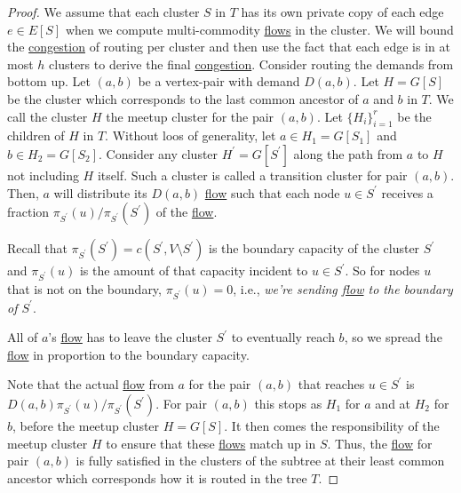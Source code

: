 \begin{proof}
	We assume that each cluster \(S\) in \(T\) has its own private copy of each edge \(e \in E[S]\) when we compute multi-commodity \hyperref[def:flow]{flows} in the cluster. We will bound the \hyperref[def:congestion]{congestion} of routing per cluster and then use the fact that each edge is in at most \(h\) clusters to derive the final \hyperref[def:congestion]{congestion}. Consider routing the demands from bottom up. Let \((a, b)\) be a vertex-pair with demand \(D(a, b)\). Let \(H = G[S]\) be the cluster which corresponds to the last common ancestor of \(a\) and \(b\) in \(T\). We call the cluster \(H\) the meetup cluster for the pair \((a, b)\). Let \(\{ H_i \} _{i=1}^{r}\) be the children of \(H\) in \(T\). Without loos of generality, let \(a \in H_1 = G[S_1]\) and \(b \in H_2 = G[S_2]\). Consider any cluster \(H^{\prime} = G[S^{\prime} ]\) along the path from \(a\) to \(H\) not including \(H\) itself. Such a cluster is called a transition cluster for pair \((a, b)\). Then, \(a\) will distribute its \(D(a, b)\) \hyperref[def:flow]{flow} such that each node \(u \in S^{\prime} \) receives a fraction \(\pi _{S^{\prime} }(u) / \pi _{S^{\prime} }(S^{\prime} )\) of the \hyperref[def:flow]{flow}.

	\begin{remark}
		Recall that \(\pi _{S^{\prime} }(S^{\prime} ) = c(S^{\prime} , V\setminus S^{\prime} )\) is the boundary capacity of the cluster \(S^{\prime} \) and \(\pi _{S^{\prime} }(u)\) is the amount of that capacity incident to \(u \in S^{\prime} \). So for nodes \(u\) that is not on the boundary, \(\pi _{S^{\prime} }(u) = 0\), i.e., \emph{we're sending \hyperref[def:flow]{flow} to the boundary of \(S^{\prime} \)}.
	\end{remark}

	\begin{intuition}
		All of \(a\)'s \hyperref[def:flow]{flow} has to leave the cluster \(S^{\prime} \) to eventually reach \(b\), so we spread the \hyperref[def:flow]{flow} in proportion to the boundary capacity.
	\end{intuition}

	Note that the actual \hyperref[def:flow]{flow} from \(a\) for the pair \((a, b)\) that reaches \(u \in S^{\prime} \) is \(D(a, b) \pi _{S^{\prime} }(u) / \pi _{S^{\prime} }(S^{\prime} )\). For pair \((a, b)\) this stops as \(H_1\) for \(a\) and at \(H_2\) for \(b\), before the meetup cluster \(H = G[S]\). It then comes the responsibility of the meetup cluster \(H\) to ensure that these \hyperref[def:flow]{flows} match up in \(S\). Thus, the \hyperref[def:flow]{flow} for pair \((a, b)\) is fully satisfied in the clusters of the subtree at their least common ancestor which corresponds how it is routed in the tree \(T\).


\end{proof}
